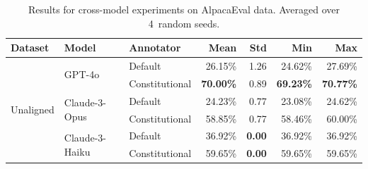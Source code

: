 \begin{table}[H]
\centering
\caption{Results for cross-model experiments on AlpacaEval data. Averaged over 4~random seeds.}
\label{tab:crossmodel_num_results}
\begin{tabularx}{\textwidth}{lllrrrr}
\toprule
\textbf{Dataset} & \textbf{Model} & \textbf{Annotator} & \textbf{Mean} & \textbf{Std} & \textbf{Min} & \textbf{Max} \\
\midrule
\multirow[t]{6}{*}{Unaligned} & \multirow[t]{2}{*}{GPT-4o} & Default & 26.15\% & 1.26 & 24.62\% & 27.69\% \\
 &  & Constitutional & \textbf{70.00\%} & 0.89 & \textbf{69.23\%} & \textbf{70.77\%} \\
 & \multirow[t]{2}{*}{Claude-3-Opus} & Default & 24.23\% & 0.77 & 23.08\% & 24.62\% \\
 &  & Constitutional & 58.85\% & 0.77 & 58.46\% & 60.00\% \\
 & \multirow[t]{2}{*}{Claude-3-Haiku} & Default & 36.92\% & \textbf{0.00} & 36.92\% & 36.92\% \\
 &  & Constitutional & 59.65\% & \textbf{0.00} & 59.65\% & 59.65\% \\
\bottomrule
\end{tabularx}
\end{table}
